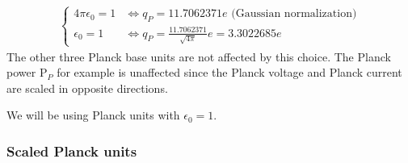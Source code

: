 \documentclass[10pt]{report}
\begin{document}
\begin{align*}
  \begin{cases}
      4 \pi \epsilon_0 = 1 &\iff q_P = 11.7062371 e \text{  (Gaussian normalization)} \\
      \epsilon_0 = 1 &\iff q_P = \frac{11.7062371}{\sqrt{4 \pi}} e = 3.3022685 e
  \end{cases}
\end{align*}
 The other three Planck base units are not affected by this choice. The Planck power $\mathrm{P}_P$ for example is unaffected since the Planck voltage and Planck current are scaled in opposite directions.

We will be using Planck units with $\epsilon_0 = 1$.
\subsubsection{Scaled Planck units} \label{scpunits}
\end{document}
